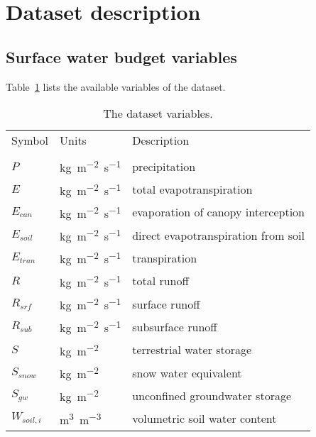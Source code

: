 \documentclass[essd]{copernicus}
\begin{document}
\section{Dataset description} \label{sec:data}

\subsection{Surface water budget variables}

Table~\ref{tbl:variables} lists the available variables of the dataset.

\begin{table}[t]
    \caption{The dataset variables.}
    \label{tbl:variables}
    \centering
    \begin{tabular}{lll}
        \tophline
        Symbol       & Units                   & Description                         \\
        \middlehline
        \multicolumn{3}{c}{surface water budget}                                     \\
        $P$          & \unit{kg~m^{-2}~s^{-1}} & precipitation                       \\
        $E$          & \unit{kg~m^{-2}~s^{-1}} & total evapotranspiration            \\
        $E_{can}$    & \unit{kg~m^{-2}~s^{-1}} & evaporation of canopy interception  \\
        $E_{soil}$   & \unit{kg~m^{-2}~s^{-1}} & direct evapotranspiration from soil \\
        $E_{tran}$   & \unit{kg~m^{-2}~s^{-1}} & transpiration                       \\
        $R$          & \unit{kg~m^{-2}~s^{-1}} & total runoff                        \\
        $R_{srf}$    & \unit{kg~m^{-2}~s^{-1}} & surface runoff                      \\
        $R_{sub}$    & \unit{kg~m^{-2}~s^{-1}} & subsurface runoff                   \\
        $S$          & \unit{kg~m^{-2}}        & terrestrial water storage           \\
        $S_{snow}$   & \unit{kg~m^{-2}}        & snow water equivalent               \\
        $S_{gw}$     & \unit{kg~m^{-2}}        & unconfined groundwater storage      \\
        $W_{soil,i}$ & \unit{m^3~m^{-3}}       & volumetric soil water content       \\

\end{tabular}
\end{table}
\end{document}
